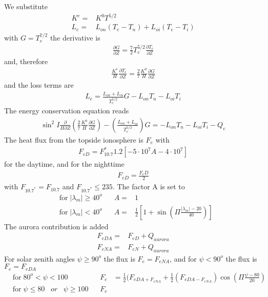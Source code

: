 We substitute
%
\begin{align}
K^e = & K^0 T^{5/2} \\
L_e = & L_{on} (T_e - T_n) + L_{oi}(T_e - T_i)
\end{align}
%
with $G = T_e^{7/2}$ the derivative is
%
\begin{align}
  \frac{\partial G}{\partial Z} = \frac{7}{2} T_e^{5/2} \frac{\partial T_e}{\partial Z}
\end{align}
%
and, therefore
%
\begin{align}
  \frac{K^e}{H}\frac{\partial T_e}{\partial Z} = \frac{2}{7} \frac{K^0}{H} \frac{\partial G}{\partial Z}
\end{align}
%
and the loss terms are
%
\begin{align}
  L_e = \frac{L_{on}+L_{oi}}{T_e^{5/2}} G - L_{on} T_n - L_{oi} T_i
\end{align}
%
The energy conservation equation reads
%
\begin{align}
   \sin^2 I \frac{\partial}{H \partial Z}\left( \frac{2}{7}\frac{K^0}{H}
    \frac{\partial G}{ \partial Z}\right) - \left( \frac{L_{on}+L_{oi}}{T_e^{5/2}}
    \right) G = -L_{on} T_n - L_{oi}T_i - Q_e
\end{align}
%
The heat flux from the topside ionosphere is $F_e$ with
%
\begin{align}
  F_{eD} = F_{10.7}^* 1.2 [-5 \cdot 10^7 A - 4 \cdot 10^7] \label{settei:eq_FeD}
\end{align}
%
for the daytime, and for the nighttime
%
\begin{align}
  F_{eD} = \frac{F_eD}{2}
\end{align}
%
with $F_{10.7^*}= F_{10.7}$ and $F_{10.7^*}\leq 235$. The factor A
is set to
%
\begin{align}
 {}& \text{for} \; |\lambda_m| \geq 40^o \; \; \; & A =&1 \\
 {} & \text{for} \; |\lambda_m| < 40^o \; \; \; & A = &\frac{1}{2} [1+\sin(\Pi \frac{|\lambda_m|-20}{40})]
\end{align}
%
The aurora contribution is added
%
\begin{align}
  F_{eDA} = & F_{eD} + Q_{aurora} \\
  F_{eNA} = & F_{eN} + Q_{aurora}
\end{align}
%
For solar zenith angles $\psi \geq 90^o$ the flux is $F_e =
F_{eNA}$, and for $\psi < 90^o$ the flux is $F_e = F_{eDA}$
%
\begin{align}
 {} & \text{for} \;  80^o < \psi < 100 \; \; \; & F_e & {}= \frac{1}{2} (F_{eDA + F_{eNA}}+
      \frac{1}{2} (F_{eDA - F_{eNA}}) \cos(\Pi \frac{\psi-80}{20}) \\
 {} & \text{for} \; \psi \leq 80 \; \; \; or \; \; \;\psi \geq 100 \; \; \; & F_e & {}
\end{align}
